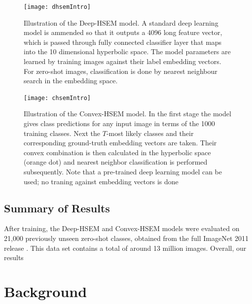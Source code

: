 \documentclass[12pt]{report}
\begin{document}
\begin{figure}
  \centering
	\texttt{[image: dhsemIntro]}
	\caption{Illustration of the Deep-HSEM model. A standard deep learning model is ammended so that it outputs a 4096 long feature vector, which is passed through fully connected classifier layer that maps into the 10 dimensional hyperbolic space. The model parameters are learned by training images against their label embedding vectors. For zero-shot images, classification is done by nearest neighbour search in the embedding space.}
	\label{fig:dhsemIntro}
\end{figure}

\begin{figure}
  \centering
	\texttt{[image: chsemIntro]}
	\caption{Illustration of the Convex-HSEM model. In the first stage the model gives class predictions for any input image in terms of the 1000 training classes. Next the $T$-most likely classes and their corresponding ground-truth embedding vectors are taken. Their convex combination is then calculated in the hyperbolic space (orange dot) and nearest neighbor classification is performed subsequently. Note that a pre-trained deep learning model can be used; no traning against embedding vectors is done}
	\label{fig:chsemIntro}
\end{figure}

\section{Summary of Results}

After training, the Deep-HSEM and Convex-HSEM models were evaluated on 21,000 previously unseen zero-shot classes, obtained from the full ImageNet 2011 release \cite{JiaDeng2009}. This data set contains a total of around 13 million images. Overall, our results

\newpage

\chapter{Background} \label{ch:backg}
\end{document}
